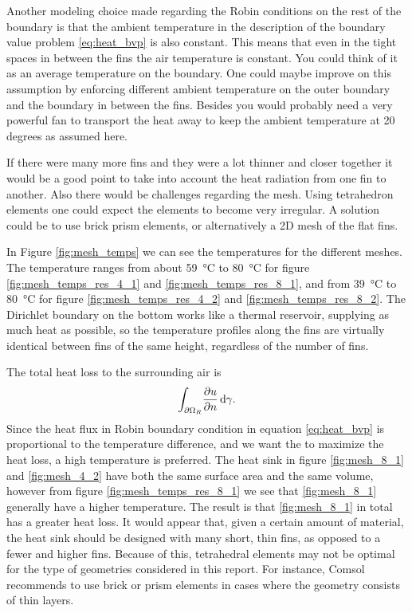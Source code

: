 Another modeling choice made regarding the Robin conditions on the rest of the boundary is that the ambient temperature in the description of the boundary value problem \eqref{eq:heat_bvp} is also constant. This means that even in the tight spaces in between the fins the air temperature is constant. You could think of it as an average temperature on the boundary. One could maybe improve on this assumption by enforcing different ambient temperature on the outer boundary and the boundary in between the fins. Besides you would probably need a very powerful fan to transport the heat away to keep the ambient temperature at 20 degrees as assumed here.

If there were many more fins and they were a lot thinner and closer together it would be a good point to take into account the heat radiation from one fin to another. Also there would be challenges regarding the mesh. Using tetrahedron elements one could expect the elements to become very irregular. A solution could be to use brick prism elements, or alternatively a 2D mesh of the flat fins.

In Figure \ref{fig:mesh_temps} we can see the temperatures for the different meshes. The temperature ranges from about \SI{59}{\celsius} to \SI{80}{\celsius} for figure \ref{fig:mesh_temps_res_4_1} and \ref{fig:mesh_temps_res_8_1}, and from \SI{39}{\celsius} to \SI{80}{\celsius} for figure \ref{fig:mesh_temps_res_4_2} and \ref{fig:mesh_temps_res_8_2}. The Dirichlet boundary on the bottom works like a thermal reservoir, supplying as much heat as possible, so the temperature profiles along the fins are virtually identical between fins of the same height, regardless of the number of fins.

The total heat loss to the surrounding air is
\begin{equation}
\int_{\partial\Omega_R}\! \pdv{u}{n}\, \mathrm{d}{\gamma}.
\end{equation}
Since the heat flux in Robin boundary condition in equation \eqref{eq:heat_bvp} is proportional to the temperature difference, and we want the to maximize the heat loss, a high temperature is preferred. The heat sink in figure \ref{fig:mesh_8_1} and \ref{fig:mesh_4_2} have both the same surface area and the same volume,  however from figure \ref{fig:mesh_temps_res_8_1} we see that \ref{fig:mesh_8_1} generally have a higher temperature. The result is that \ref{fig:mesh_8_1} in total has a greater heat loss. It would appear that, given a certain amount of material, the heat sink should be designed with many short, thin fins, as opposed to a fewer and higher fins. Because of this, tetrahedral elements may not be optimal for the type of geometries considered in this report. For instance, Comsol \cite{comsol_mesh_types} recommends to use brick or prism elements in cases where the geometry consists of thin layers.
